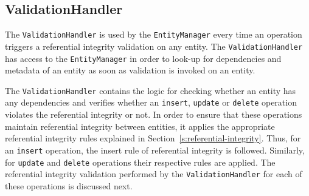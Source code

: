 		\subsection{ValidationHandler}\label{ss:VH}
		The \texttt{ValidationHandler} is used by the \texttt{EntityManager} every time
		an operation triggers a referential integrity validation on any entity.
		The \texttt{ValidationHandler} has access to the \texttt{EntityManager} in order
		to look-up for dependencies and metadata of an entity as soon as  validation is
		invoked on an entity.
		
		The \texttt{ValidationHandler} contains the  logic for checking whether an
		entity has any dependencies and verifies whether an \texttt{insert}, 
		\texttt{update} or \texttt{delete} operation  violates the referential integrity
		or not.   In order to ensure that these operations maintain referential integrity
		between entities,  it applies the appropriate referential integrity rules
		explained in Section~\ref{s:referential-integrity}.  Thus,  for an \texttt{insert}
		operation,  the insert rule of referential integrity is followed.  Similarly,  for
		\texttt{update} and \texttt{delete} operations their respective rules are
		applied.   The referential integrity validation performed by the
		\texttt{ValidationHandler} for each of these operations is discussed next. 
		
